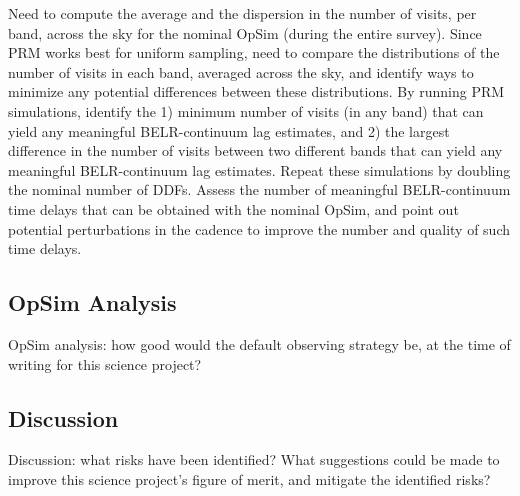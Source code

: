 Need to compute the average and the dispersion in the
number of visits, per band, across the sky for the nominal OpSim
(during the entire survey). Since PRM works best for uniform sampling,
need to compare the distributions of the number of visits in each
band, averaged across the sky, and identify ways to minimize any
potential differences between these distributions. By running PRM
simulations, identify the 1) minimum number of visits (in any band)
that can yield any meaningful BELR-continuum lag estimates, and 2) the
largest difference in the number of visits between two different bands
that can yield any meaningful BELR-continuum lag estimates. Repeat
these simulations by doubling the nominal number of DDFs. Assess the
number of meaningful BELR-continuum time delays that can be obtained
with the nominal OpSim, and point out potential perturbations in the
cadence to improve the number and quality of such time delays.




\subsection{OpSim Analysis}
\label{sec:\secname:analysis}

OpSim analysis: how good would the default observing strategy be, at
the time of writing for this science project?



\subsection{Discussion}
\label{sec:\secname:discussion}

Discussion: what risks have been identified? What suggestions could be
made to improve this science project's figure of merit, and mitigate
the identified risks?



\navigationbar
